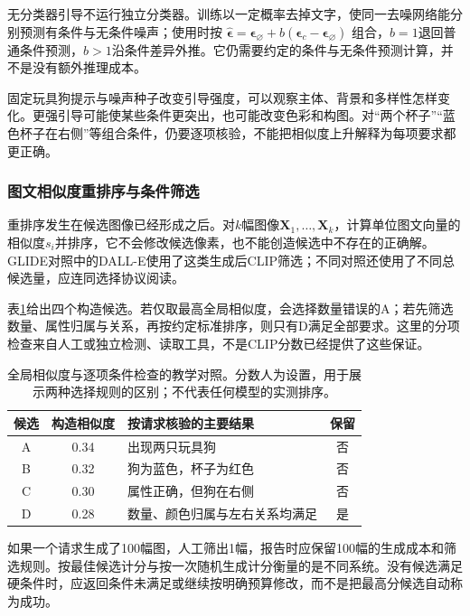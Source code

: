 无分类器引导不运行独立分类器。训练以一定概率去掉文字，使同一去噪网络能分别预测有条件与无条件噪声；使用时按
$\hat{\bm{\epsilon}}=\bm{\epsilon}_{\varnothing}+b(\bm{\epsilon}_{c}-\bm{\epsilon}_{\varnothing})$
组合，$b=1$退回普通条件预测，$b>1$沿条件差异外推。它仍需要约定的条件与无条件预测计算，并不是没有额外推理成本。

固定玩具狗提示与噪声种子改变引导强度，可以观察主体、背景和多样性怎样变化。更强引导可能使某些条件更突出，也可能改变色彩和构图。对“两个杯子”“蓝色杯子在右侧”等组合条件，仍要逐项核验，不能把相似度上升解释为每项要求都更正确。

\subsubsection{图文相似度重排序与条件筛选}
\label{sec:vision-generation-reranking}

重排序发生在候选图像已经形成之后。对$k$幅图像$\bm{X}_1,\ldots,\bm{X}_k$，计算单位图文向量的相似度$s_i$并排序，它不会修改候选像素，也不能创造候选中不存在的正确解。GLIDE对照中的DALL-E使用了这类生成后CLIP筛选；不同对照还使用了不同总候选量，应连同选择协议阅读。

表\ref{tab:vision-generation-candidates}给出四个构造候选。若仅取最高全局相似度，会选择数量错误的A；若先筛选数量、属性归属与关系，再按约定标准排序，则只有D满足全部要求。这里的分项检查来自人工或独立检测、读取工具，不是CLIP分数已经提供了这些保证。

\begin{table}[htbp]
 \centering
 \small
 \begin{tabularx}{\linewidth}{@{}c c X c@{}}
  \toprule
  候选 & 构造相似度 & 按请求核验的主要结果 & 保留\\
  \midrule
  A & 0.34 & 出现两只玩具狗 & 否\\
  B & 0.32 & 狗为蓝色，杯子为红色 & 否\\
  C & 0.30 & 属性正确，但狗在右侧 & 否\\
  D & 0.28 & 数量、颜色归属与左右关系均满足 & 是\\
  \bottomrule
 \end{tabularx}
 \caption{全局相似度与逐项条件检查的教学对照。分数人为设置，用于展示两种选择规则的区别；不代表任何模型的实测排序。}
 \label{tab:vision-generation-candidates}
\end{table}

如果一个请求生成了100幅图，人工筛出1幅，报告时应保留100幅的生成成本和筛选规则。按最佳候选计分与按一次随机生成计分衡量的是不同系统。没有候选满足硬条件时，应返回条件未满足或继续按明确预算修改，而不是把最高分候选自动称为成功。

